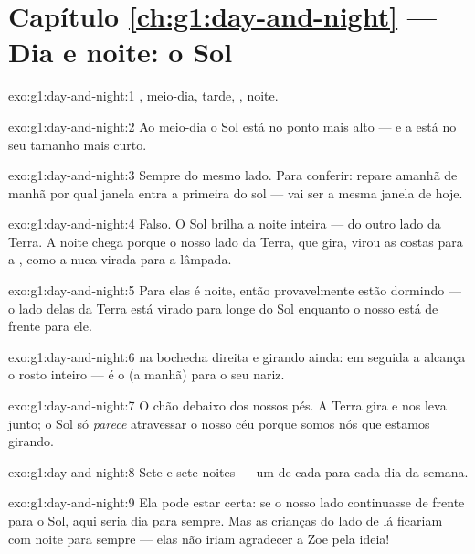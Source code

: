 \section*{Capítulo \ref{ch:g1:day-and-night} --- Dia e noite: o Sol}

\begin{solution}{exo:g1:day-and-night:1}
, meio-dia, tarde, , noite.
\end{solution}

\begin{solution}{exo:g1:day-and-night:2}
Ao meio-dia o Sol está no ponto mais alto --- e a  está no seu
tamanho mais curto.
\end{solution}

\begin{solution}{exo:g1:day-and-night:3}
Sempre do mesmo lado. Para conferir: repare amanhã de manhã por qual
janela entra a primeira  do sol --- vai ser a mesma janela de
hoje.
\end{solution}

\begin{solution}{exo:g1:day-and-night:4}
Falso. O Sol brilha a noite inteira --- do outro lado da Terra. A
noite chega porque o nosso lado da Terra, que gira, virou as costas
para a , como a nuca virada para a lâmpada.
\end{solution}

\begin{solution}{exo:g1:day-and-night:5}
Para elas é noite, então provavelmente estão dormindo --- o lado
delas da Terra está virado para longe do Sol enquanto o nosso está de
frente para ele.
\end{solution}

\begin{solution}{exo:g1:day-and-night:6}
 na bochecha direita e girando ainda: em seguida a  alcança o
rosto inteiro --- é o  (a manhã) para o seu nariz.
\end{solution}

\begin{solution}{exo:g1:day-and-night:7}
O chão debaixo dos nossos pés. A Terra gira e nos leva junto; o Sol
só \emph{parece} atravessar o nosso céu porque somos nós que estamos
girando.
\end{solution}

\begin{solution}{exo:g1:day-and-night:8}
Sete  e sete noites --- um de cada para cada dia da
semana.
\end{solution}

\begin{solution}{exo:g1:day-and-night:9}
Ela pode estar certa: se o nosso lado continuasse de frente para o
Sol, aqui seria dia para sempre. Mas as crianças do lado de lá
ficariam com noite para sempre --- elas não iriam agradecer a Zoe
pela ideia!
\end{solution}
